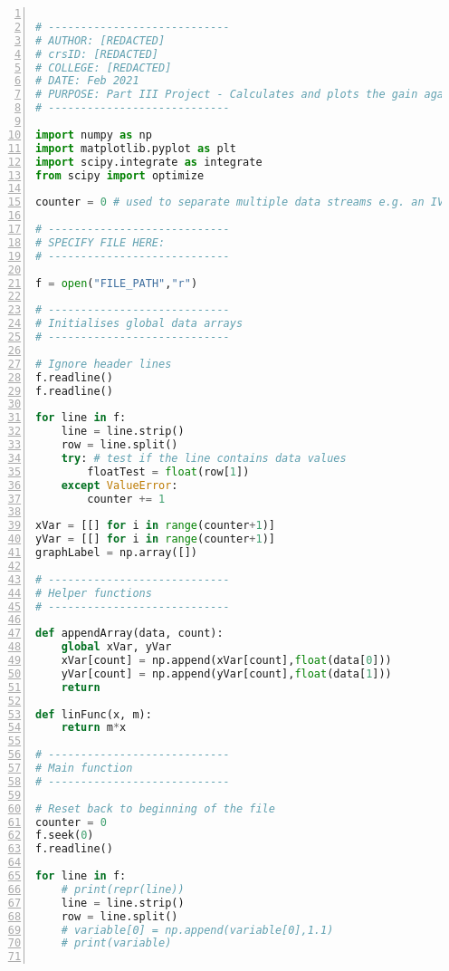 \begin{lstlisting}[language=Python, basicstyle=\footnotesize, numbers=left, numberstyle=\tiny, breaklines=true, commentstyle=\itshape\color{magenta}, keywordstyle=\bfseries\color{blue}, identifierstyle=\color{cyan}, stringstyle=\color{red}, showstringspaces=false]

# ----------------------------
# AUTHOR: [REDACTED]
# crsID: [REDACTED]
# COLLEGE: [REDACTED]
# DATE: Feb 2021
# PURPOSE: Part III Project - Calculates and plots the gain against overvoltage of the SiPM by via the integral of the current. A linear regression is performed on the data.
# ----------------------------

import numpy as np
import matplotlib.pyplot as plt
import scipy.integrate as integrate
from scipy import optimize

counter = 0 # used to separate multiple data streams e.g. an IV graph with different resistance values

# ----------------------------
# SPECIFY FILE HERE:
# ----------------------------

f = open("FILE_PATH","r")

# ----------------------------
# Initialises global data arrays
# ----------------------------

# Ignore header lines
f.readline()
f.readline()

for line in f:
    line = line.strip()
    row = line.split()
    try: # test if the line contains data values
        floatTest = float(row[1])
    except ValueError:
        counter += 1

xVar = [[] for i in range(counter+1)]
yVar = [[] for i in range(counter+1)]
graphLabel = np.array([])

# ----------------------------
# Helper functions
# ----------------------------

def appendArray(data, count):
    global xVar, yVar
    xVar[count] = np.append(xVar[count],float(data[0]))
    yVar[count] = np.append(yVar[count],float(data[1]))
    return

def linFunc(x, m):
    return m*x

# ----------------------------
# Main function
# ----------------------------

# Reset back to beginning of the file
counter = 0
f.seek(0)
f.readline()

for line in f:
    # print(repr(line))
    line = line.strip()
    row = line.split()
    # variable[0] = np.append(variable[0],1.1)
    # print(variable)


\end{lstlisting}
